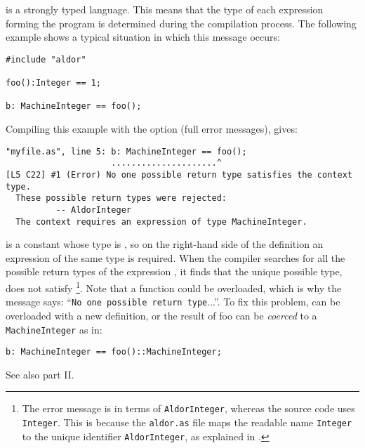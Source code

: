 
\asharp{} is a strongly typed language. This means that the type of
each expression forming the program is determined during the
compilation process. The following example shows a typical situation
in which this message occurs:

{\small
\begin{verbatim}
#include "aldor"

foo():Integer == 1;

b: MachineInteger == foo();
\end{verbatim}
}

Compiling this example with the option  (full error
messages), gives:

\begin{small}
\begin{verbatim}
"myfile.as", line 5: b: MachineInteger == foo();
                     .....................^
[L5 C22] #1 (Error) No one possible return type satisfies the context type.
  These possible return types were rejected:
          -- AldorInteger
  The context requires an expression of type MachineInteger.
\end{verbatim}
\end{small}

 is a constant whose type is , so on the right-hand
side of the definition an expression of the same type is required. When
the compiler searches for all the possible return types of the
expression , it
finds that the unique possible type,  does not satisfy
\footnote{The error message is in terms of {\tt AldorInteger},
whereas the source code uses {\tt Integer}.  This is because the {\tt aldor.as}
file maps the readable name {\tt Integer} to the unique identifier
{\tt AldorInteger}, as explained in .}.
Note that a function could be overloaded, which is why
the message says: ``{\tt No one possible return type}...''. To fix this
problem,  can be overloaded with a new definition, or the result of
foo can be {\em coerced} to a {\tt MachineInteger} as in:
\begin{verbatim}
b: MachineInteger == foo()::MachineInteger;
\end{verbatim}
See also part II.

\goodbreak

